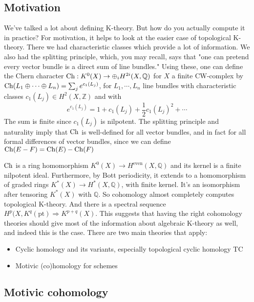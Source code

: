 \documentclass[main]{subfiles}
\begin{document}
\subsection{Motivation}

We've talked a lot about defining K-theory. But how do you actually compute it in practice? For motivation, it helps to look at the easier case of topological K-theory. There we had characteristic classes which provide a lot of information. We also had the splitting principle, which, you may recall, says that "one can pretend every vector bundle is a direct sum of line bundles." Using these, one can define the Chern character $\operatorname{Ch}:K^0(X)\to\oplus_iH^{2i}(X,\mathbb Q)$ for $X$ a finite CW-complex by $\operatorname{Ch}(L_1\oplus\cdots\oplus L_n)=\sum_je^{c_1(L_j)}$, for $L_1,\cdots,L_n$ line bundles with characteristic classes $c_1(L_j)\in H^2(X,\mathbb Z)$ and with
\[
e^{c_1(L_j)}=1+c_1(L_j)+\frac{1}{2}c_1(L_j)^2+\cdots
\]
The sum is finite since $c_1(L_j)$ is nilpotent. The splitting principle and naturality imply that $\operatorname{Ch}$ is well-defined for all vector bundles, and in fact for all formal differences of vector bundles, since we can define $\operatorname{Ch}(E-F)=\operatorname{Ch}(E)-\operatorname{Ch}(F)$

\begin{theorem}
$\operatorname{Ch}$ is a ring homomorphism $K^0(X)\to H^{\text{even}}(X,\mathbb Q)$ and its kernel is a finite nilpotent ideal. Furthermore, by Bott periodicity, it extends to a homomorphism of graded rings $K^*(X)\to H^*(X,\mathbb Q)$, with finite kernel. It's an isomorphism after tensoring $K^*(X)$ with $\mathbb Q$. So cohomology almost completely computes topological K-theory. And there is a spectral sequence $H^p(X,K^q(\text{pt})\Rightarrow K^{p+q}(X)$. This suggests that having the right cohomology theories should give most of the information about algebraic K-theory as well, and indeed this is the case. There are two main theories that apply:
\begin{itemize}
\item Cyclic homology and its variants, especially topological cyclic homology TC
\item Motivic (co)homology for schemes
\end{itemize}
\end{theorem}

\subsection{Motivic cohomology}
\end{document}
